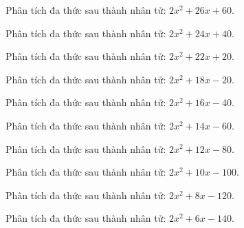\begin{bt}
	Phân tích đa thức sau thành nhân tử: $2 x^2 + 26 x + 60$.
\end{bt}
\begin{bt}
	Phân tích đa thức sau thành nhân tử: $2 x^2 + 24 x + 40$.
\end{bt}
\begin{bt}
	Phân tích đa thức sau thành nhân tử: $2 x^2 + 22 x + 20$.
\end{bt}
\begin{bt}
	Phân tích đa thức sau thành nhân tử: $2 x^2 + 18 x - 20$.
\end{bt}
\begin{bt}
	Phân tích đa thức sau thành nhân tử: $2 x^2 + 16 x - 40$.
\end{bt}
\begin{bt}
	Phân tích đa thức sau thành nhân tử: $2 x^2 + 14 x - 60$.
\end{bt}
\begin{bt}
	Phân tích đa thức sau thành nhân tử: $2 x^2 + 12 x - 80$.
\end{bt}
\begin{bt}
	Phân tích đa thức sau thành nhân tử: $2 x^2 + 10 x - 100$.
\end{bt}
\begin{bt}
	Phân tích đa thức sau thành nhân tử: $2 x^2 + 8 x - 120$.
\end{bt}
\begin{bt}
	Phân tích đa thức sau thành nhân tử: $2 x^2 + 6 x - 140$.
\end{bt}
